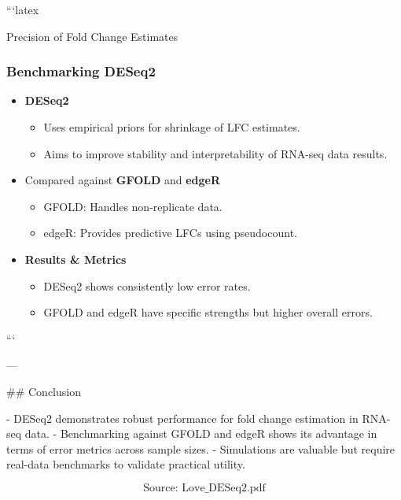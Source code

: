 ```latex
\begin{frame}{Precision of Fold Change Estimates}
    \frametitle{Benchmarking DESeq2}
    \begin{itemize}
        \item \textbf{DESeq2} 
        \begin{itemize}
            \item Uses empirical priors for shrinkage of LFC estimates.
            \item Aims to improve stability and interpretability of RNA-seq data results.
        \end{itemize}
        \item Compared against \textbf{GFOLD} and \textbf{edgeR}
        \begin{itemize}
            \item GFOLD: Handles non-replicate data.
            \item edgeR: Provides predictive LFCs using pseudocount.
        \end{itemize}
        \item \textbf{Results \& Metrics}
        \begin{itemize}
            \item DESeq2 shows consistently low error rates.
            \item GFOLD and edgeR have specific strengths but higher overall errors.
        \end{itemize}
    \end{itemize}
\end{frame}
```

---

## Conclusion

- DESeq2 demonstrates robust performance for fold change estimation in RNA-seq data.
- Benchmarking against GFOLD and edgeR shows its advantage in terms of error metrics across sample sizes.
- Simulations are valuable but require real-data benchmarks to validate practical utility.

\[ \text{Source: Love\_DESeq2.pdf} \]